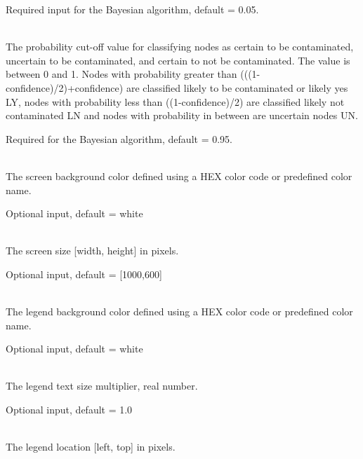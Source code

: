 \begin{description}[topsep=0pt,parsep=0.5em,itemsep=-0.4em]
\begin{description}[topsep=0pt,parsep=0.5em,itemsep=-0.4em]
                Required input for the Bayesian algorithm, default = 0.05.
    \item[{confidence}]\hfill
\\The probability cut-off value for classifying nodes as certain to be contaminated, 
                uncertain to be contaminated, and certain to not be contaminated. The value is 
                between 0 and 1. Nodes with probability greater than (((1-confidence)/2)+confidence) are 
                classified likely to be contaminated or likely yes LY, 
                nodes with probability less than ((1-confidence)/2) are classified likely not contaminated
                LN and nodes with probability in between are uncertain nodes UN.
                
                Required for the Bayesian algorithm, default = 0.95.
  \end{description}
  \item[{visualization}]\hfill
  \begin{description}[topsep=0pt,parsep=0.5em,itemsep=-0.4em]
    \item[{screen}]\hfill
    \begin{description}[topsep=0pt,parsep=0.5em,itemsep=-0.4em]
      \item[{color}]\hfill
\\The screen background color defined using a HEX color code or predefined color name.
                
                Optional input, default = white
      \item[{size}]\hfill
\\The screen size [width, height] in pixels.
                
                Optional input, default = [1000,600]
    \end{description}
    \item[{legend}]\hfill
    \begin{description}[topsep=0pt,parsep=0.5em,itemsep=-0.4em]
      \item[{color}]\hfill
\\The legend background color defined using a HEX color code or predefined color name.
                
                Optional input, default = white
      \item[{scale}]\hfill
\\The legend text size multiplier, real number.
                
                Optional input, default = 1.0
      \item[{location}]\hfill
\\The legend location [left, top] in pixels.
                

\end{description}
\end{description}
\end{description}
